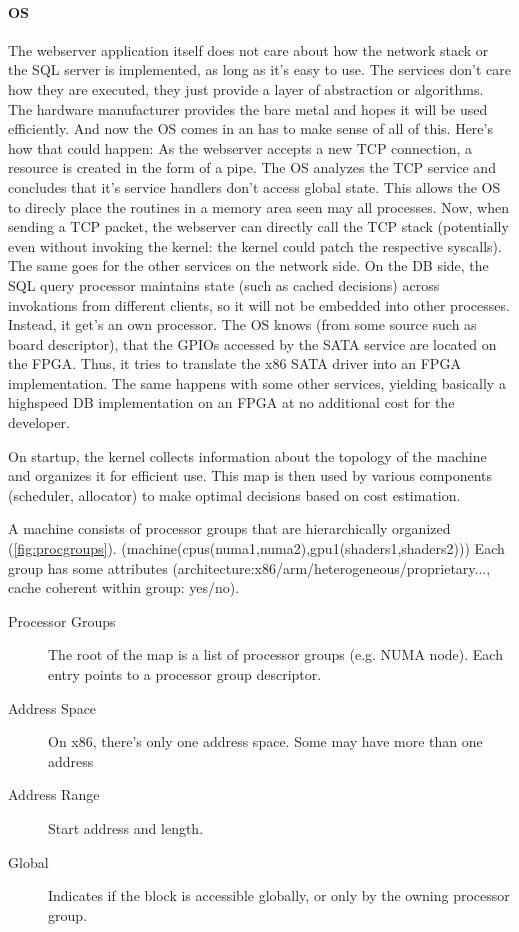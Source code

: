 \documentclass[a4paper]{article}
\begin{document}
\paragraph{OS}
The webserver application itself does not care about how the network stack or the SQL server is implemented, as long as it's easy to use. The services don't care how they are executed, they just provide a layer of abstraction or algorithms. The hardware manufacturer provides the bare metal and hopes it will be used efficiently.
And now the OS comes in an has to make sense of all of this. Here's how that could happen: As the webserver accepts a new TCP connection, a resource is created in the form of a pipe. The OS analyzes the TCP service and concludes that it's service handlers don't access global state. This allows the OS to direcly place the routines in a memory area seen may all processes. Now, when sending a TCP packet, the webserver can directly call the TCP stack (potentially even without invoking the kernel: the kernel could patch the respective syscalls). The same goes for the other services on the network side. On the DB side, the SQL query processor maintains state (such as cached decisions) across invokations from different clients, so it will not be embedded into other processes. Instead, it get's an own processor. The OS knows (from some source such as board descriptor), that the GPIOs accessed by the SATA service are located on the FPGA. Thus, it tries to translate the x86 SATA driver into an FPGA implementation. The same happens with some other services, yielding basically a highspeed DB implementation on an FPGA at no additional cost for the developer.


On startup, the kernel collects information about the topology of the machine and organizes it for efficient use. This map is then used by various components (scheduler, allocator) to make optimal decisions based on cost estimation.

A machine consists of processor groups that are hierarchically organized (\ref{fig:procgroups}). (machine(cpus(numa1,numa2),gpu1(shaders1,shaders2)))
Each group has some attributes (architecture:x86/arm/heterogeneous/proprietary..., cache coherent within group: yes/no).



\begin{description}
  
  \item[Processor Groups] The root of the map is a list of processor groups (e.g. NUMA node). Each entry points to a processor group descriptor.
    
  \item[Address Space] On x86, there's only one address space. Some may have more than one address
  \item[Address Range] Start address and length.
  \item[Global] Indicates if the block is accessible globally, or only by the owning processor group.
\end{description}
\end{document}
